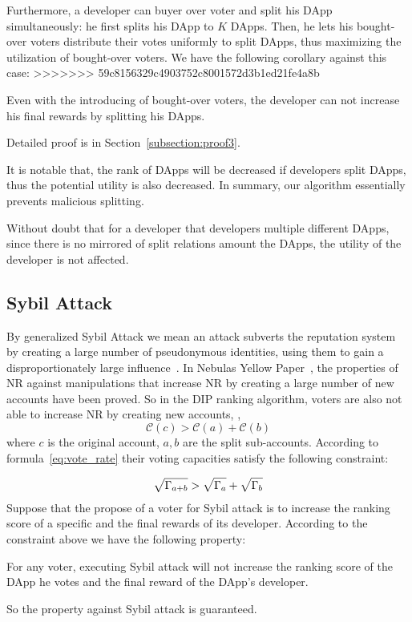 Furthermore, a developer can buyer over voter and split his DApp simultaneously: he first splits his DApp to $K$ DApps. Then, he lets his bought-over voters distribute their votes uniformly to split DApps, thus  maximizing the utilization of  bought-over  voters. We have the following corollary against this case:
>>>>>>> 59c8156329c4903752c8001572d3b1ed21fe4a8b
\begin{corollary}
	\label{c1}
	Even with the introducing of bought-over voters, the developer can not increase his final rewards by splitting his DApps.
\end{corollary}

Detailed proof is in Section~\ref{subsection:proof3}.

It is notable that, the rank of DApps will be decreased if developers split DApps, thus the potential utility is also decreased. In summary, our algorithm essentially prevents malicious splitting.

Without doubt that for a developer that developers multiple different  DApps, since there is no mirrored of split relations amount the DApps, the utility of the developer is not affected.

\subsection{Sybil Attack}
By generalized Sybil Attack we mean an attack subverts the reputation system by creating a large number of pseudonymous identities, using them to gain a disproportionately large influence~\cite{quercia2010sybil}. In Nebulas Yellow Paper~\cite{Nebulasyellowpaper}, the properties of NR against manipulations that increase NR by creating a large number of new accounts have been proved. So in the DIP ranking algorithm, voters are also not able to increase NR by creating new accounts, \ie,
$$\mathcal{C}(c)>\mathcal{C}(a)+\mathcal{C}(b)$$
where $c$ is the original account, $a,b$ are the split sub-accounts. According to formula~\ref{eq:vote_rate} their voting capacities satisfy the following constraint:

\begin{align}
	\label{eq:sqrt_nr}
	\sqrt{\Gamma_{a+b}}>\sqrt{\Gamma_a}+\sqrt{\Gamma_b}
\end{align}
Suppose that the propose of a voter for Sybil attack is to increase the ranking score of a specific and the final rewards of its developer. According to the constraint above we have the following property:

\begin{property}
	\label{p3}
    For any voter, executing Sybil attack will not increase the ranking score of the DApp he votes and the final reward of the DApp's developer.
\end{property}
So the property against Sybil attack is guaranteed.
